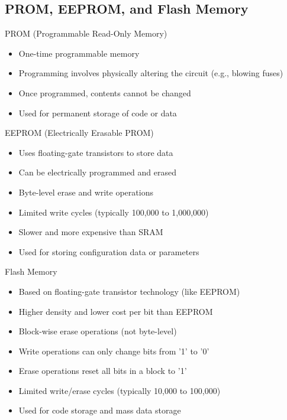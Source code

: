 \subsection{PROM, EEPROM, and Flash Memory}

\begin{concept}{PROM (Programmable Read-Only Memory)}
\begin{itemize}
    \item One-time programmable memory
    \item Programming involves physically altering the circuit (e.g., blowing fuses)
    \item Once programmed, contents cannot be changed
    \item Used for permanent storage of code or data
\end{itemize}
\end{concept}

\begin{concept}{EEPROM (Electrically Erasable PROM)}
\begin{itemize}
    \item Uses floating-gate transistors to store data
    \item Can be electrically programmed and erased
    \item Byte-level erase and write operations
    \item Limited write cycles (typically 100,000 to 1,000,000)
    \item Slower and more expensive than SRAM
    \item Used for storing configuration data or parameters
\end{itemize}
\end{concept}

\begin{concept}{Flash Memory}
\begin{itemize}
    \item Based on floating-gate transistor technology (like EEPROM)
    \item Higher density and lower cost per bit than EEPROM
    \item Block-wise erase operations (not byte-level)
    \item Write operations can only change bits from '1' to '0'
    \item Erase operations reset all bits in a block to '1'
    \item Limited write/erase cycles (typically 10,000 to 100,000)
    \item Used for code storage and mass data storage
\end{itemize}
\end{concept}

